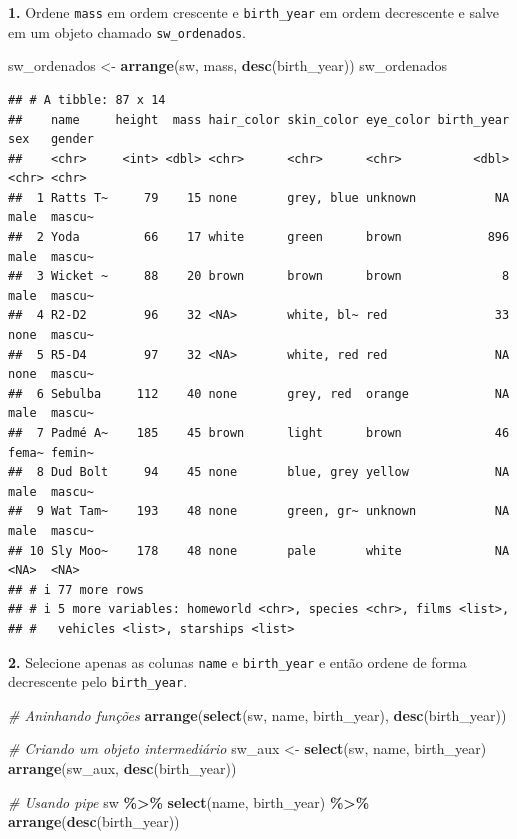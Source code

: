 \documentclass[
]{book}
\newenvironment{Shaded}{\begin{snugshade}}{\end{snugshade}}
\newcommand{\CommentTok}[1]{\textcolor[rgb]{0.56,0.35,0.01}{\textit{#1}}}
\newcommand{\FunctionTok}[1]{\textcolor[rgb]{0.13,0.29,0.53}{\textbf{#1}}}
\newcommand{\NormalTok}[1]{#1}
\newcommand{\OtherTok}[1]{\textcolor[rgb]{0.56,0.35,0.01}{#1}}
\newcommand{\SpecialCharTok}[1]{\textcolor[rgb]{0.81,0.36,0.00}{\textbf{#1}}}
\begin{document}
\textbf{1.} Ordene \texttt{mass} em ordem crescente e \texttt{birth\_year} em ordem
decrescente e salve em um objeto chamado \texttt{sw\_ordenados}.

\begin{Shaded}
\begin{Highlighting}[]
\NormalTok{sw\_ordenados }\OtherTok{\textless{}{-}} \FunctionTok{arrange}\NormalTok{(sw, mass, }\FunctionTok{desc}\NormalTok{(birth\_year))}
\NormalTok{sw\_ordenados}
\end{Highlighting}
\end{Shaded}

\begin{verbatim}
## # A tibble: 87 x 14
##    name     height  mass hair_color skin_color eye_color birth_year sex   gender
##    <chr>     <int> <dbl> <chr>      <chr>      <chr>          <dbl> <chr> <chr> 
##  1 Ratts T~     79    15 none       grey, blue unknown           NA male  mascu~
##  2 Yoda         66    17 white      green      brown            896 male  mascu~
##  3 Wicket ~     88    20 brown      brown      brown              8 male  mascu~
##  4 R2-D2        96    32 <NA>       white, bl~ red               33 none  mascu~
##  5 R5-D4        97    32 <NA>       white, red red               NA none  mascu~
##  6 Sebulba     112    40 none       grey, red  orange            NA male  mascu~
##  7 Padmé A~    185    45 brown      light      brown             46 fema~ femin~
##  8 Dud Bolt     94    45 none       blue, grey yellow            NA male  mascu~
##  9 Wat Tam~    193    48 none       green, gr~ unknown           NA male  mascu~
## 10 Sly Moo~    178    48 none       pale       white             NA <NA>  <NA>  
## # i 77 more rows
## # i 5 more variables: homeworld <chr>, species <chr>, films <list>,
## #   vehicles <list>, starships <list>
\end{verbatim}

\textbf{2.} Selecione apenas as colunas \texttt{name} e \texttt{birth\_year} e então ordene
de forma decrescente pelo \texttt{birth\_year}.

\begin{Shaded}
\begin{Highlighting}[]
\CommentTok{\# Aninhando funções}
\FunctionTok{arrange}\NormalTok{(}\FunctionTok{select}\NormalTok{(sw, name, birth\_year), }\FunctionTok{desc}\NormalTok{(birth\_year))}

\CommentTok{\# Criando um objeto intermediário}
\NormalTok{sw\_aux }\OtherTok{\textless{}{-}} \FunctionTok{select}\NormalTok{(sw, name, birth\_year)}
\FunctionTok{arrange}\NormalTok{(sw\_aux, }\FunctionTok{desc}\NormalTok{(birth\_year))}

\CommentTok{\# Usando pipe}
\NormalTok{sw }\SpecialCharTok{\%\textgreater{}\%} 
  \FunctionTok{select}\NormalTok{(name, birth\_year) }\SpecialCharTok{\%\textgreater{}\%}
  \FunctionTok{arrange}\NormalTok{(}\FunctionTok{desc}\NormalTok{(birth\_year))}
\end{Highlighting}
\end{Shaded}
\end{document}
